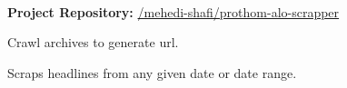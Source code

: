  \\

\vspace{\topsep}
{\bf Project Repository: }\href{https://github.com/mehedi-shafi/prothom-alo-scrapper}{\github/mehedi-shafi/prothom-alo-scrapper}
\vspace{\topsep}

\begin{tightitemize}

\item Crawl archives to generate url.
\item Scraps headlines from any given date or date range.

\end{tightitemize}

\sectionspace
